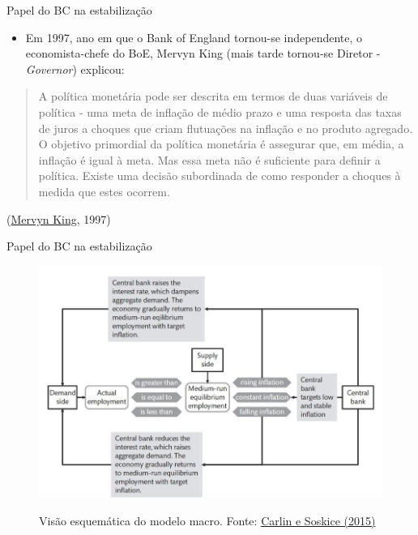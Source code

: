 \documentclass[10pt]{beamer}
\begin{document}
\begin{frame}
    {Papel do BC na estabilização}
    \begin{itemize}
        \item Em 1997, ano em que o Bank of England tornou-se independente, o economista-chefe do BoE, Mervyn King (mais tarde tornou-se Diretor - \emph{Governor}) explicou:\bigskip        
    \end{itemize}
    \begin{quote}
        A política monetária pode ser descrita em termos de duas variáveis de política - uma meta de inflação de médio prazo e uma resposta das taxas de juros a choques que criam flutuações na inflação e no produto agregado. O objetivo primordial da política monetária é assegurar que, em média, a inflação é igual à meta. Mas essa meta não é suficiente para definir a política. Existe uma decisão subordinada de como responder a choques à medida que estes ocorrem.
    \end{quote}
    \begin{flushright}
        (\href{https://en.wikipedia.org/wiki/Mervyn_King,_Baron_King_of_Lothbury}{Mervyn King}, 1997)
    \end{flushright}
\end{frame}

\begin{frame}
    {Papel do BC na estabilização}
    \begin{figure}
        \href{https://bookdown.org/robohay/economicsnotes/Figures/Policy/BoEFig.jpg}{\includegraphics[width=.65\textwidth]{./figures/aula15_fig3.jpg}}
        \caption{Visão esquemática do modelo macro. Fonte: \href{https://bookdown.org/robohay/economicsnotes/Figures/Policy/BoEFig.jpg}{Carlin e Soskice (2015)}}
    \end{figure}
\end{frame}
\end{document}
